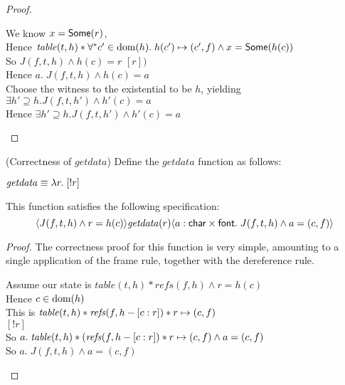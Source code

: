 \begin{proof}
\begin{tabbedproof}
\oooo We know $x = \mathsf{Some}(r)$, \\
\oooo Hence $\mathit{table}(t, h) * \forall^{*}c' \in \mbox{dom}({h}).\;h(c') \mapsto (c',f) \land x = \mathsf{Some}(h(c))$\\
\oooo So $J(f, t, h) \land h(c) = r$
\oooo $[r])$ \\
\oooo Hence $a.\; J(f, t, h) \land h(c) = a$ \\ 
\oooo Choose the witness to the existential to be $h$, yielding \\
\ooox $\exists h' \supseteq h. J(f, t, h') \land h'(c) = a$ \\ 
\oo Hence $\exists h' \supseteq h. J(f, t, h') \land h'(c) =a $\\

\end{tabbedproof}
\end{proof}

\begin{lemma}{(Correctness of $\mathit{getdata}$)}
Define the $\mathit{getdata}$ function as follows:
\begin{tabbing}
\qquad $\mathit{getdata} \equiv \lambda r.\;[!r]$  
\end{tabbing}

\noindent This function satisfies the following specification:
\begin{displaymath}
  \langle{J(f, t, h) \land r = h(c)}\rangle{\mathit{getdata}(r)}\langle{a:\mathsf{char}\times \mathsf{font}}.\;{J(f, t, h) \land a = (c, f)}\rangle
\end{displaymath}
\end{lemma}

\begin{proof}
The correctness proof for this function is very simple, amounting to a single application
of the frame rule, together with the dereference rule.
\begin{tabbedproof}
\oo Assume our state is $\mathit{table}(t, h) * \mathit{refs}(f, h) \land r = h(c)$ \\
\oo Hence $c \in \mbox{dom}({h})$ \\ 
\oo This is $\mathit{table}(t, h) * \mathit{refs}(f, h - [c:r]) * r \mapsto (c,f)$ \\
\oo $[!r]$ \\
\oo So $a.\; \mathit{table}(t, h) * (\mathit{refs}(f, h - [c:r]) * r \mapsto (c,f) \land a = (c,f)$ \\
\oo So $a.\; J(f, t, h) \land a = (c,f)$
\end{tabbedproof}
\end{proof}

